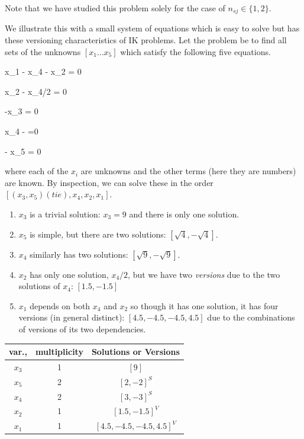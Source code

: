 \documentclass[letterpaper]{article}
\begin{document}
Note that we have studied this problem solely for the case of $n_{sj} \in \{ 1,2\}$.

We illustrate this with  a small system of equations which is easy to solve but has these
versioning characteristics
of IK problems.
Let the problem  be to find all sets of the unknowns $[x_1 \dots x_5]$ which satisfy the following five equations.

\beq\label{X1Eqn}
x_1 - x_4 - x_2 = 0
\eeq

\beq
x_2 - x_4/2 = 0
\eeq

-x_3 = 0
\eeq

\beq\label{X4Eqn}
x_4 -  =0
\eeq

\beq\label{X5Eqn}
 - x_5 = 0
\eeq

where each of the $x_i$ are unknowns and the other terms (here they are numbers) are known.
By inspection, we can solve these in the order  $[(x_3, x_5)(tie), x_4, x_2, x_1 ]$.

\begin{enumerate}
\item $x_3$ is a trivial solution: $x_3=9$ and there is only one solution.
\item $x_5$ is simple, but there are two solutions: $[\sqrt{4}, -\sqrt{4}]$.
\item $x_4$ similarly has two solutions:  $[\sqrt{9}, -\sqrt{9}]$.
\item $x_2$ has only one solution, $x_4/2$, but we have two {\it versions} due
to the two solutions of $x_4$: $[1.5,-1.5]$
\item $x_1$ depends on both $x_4$ and $x_2$ so though it has one solution, it
has four versions (in general distinct): $[4.5, -4.5, -4.5, 4.5]$ due to the
combinations of versions of its two dependencies.
\end{enumerate}

\vspace{0.1in}
\begin{center}
\begin{tabular}{c|c|c}
var.,    & multiplicity  &  Solutions or Versions\\\hline
$x_3$    &   1    & $[9]$\\
$x_5$    &   2    & $[2,-2]^S$\\
$x_4$    &   2    & $[3,-3]^S$\\
$x_2$    &   1    & $[1.5,-1.5]^V$\\
$x_1$    &   1    & $[4.5,-4.5,-4.5,4.5]^V$\\
\end{tabular}
\end{center}
\vspace{0.1in}
\end{document}

